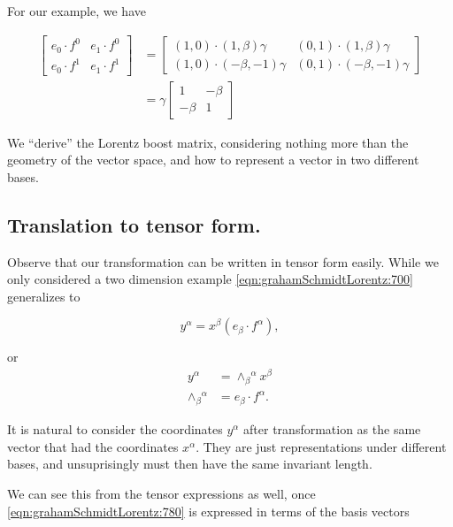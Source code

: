 \documentclass[iop,tighten]{emulateapj}
\begin{document}
For our example, we have

\begin{equation}\label{eqn:grahamSchmidtLorentz:740}
\begin{aligned}
\begin{bmatrix}
e_0 \cdot f^0 & e_1 \cdot f^0 \\
e_0 \cdot f^1 & e_1 \cdot f^1
\end{bmatrix}
&=
\begin{bmatrix}
(1, 0) \cdot ( 1, \beta ) \gamma & (0, 1) \cdot ( 1, \beta ) \gamma \\
(1, 0) \cdot ( -\beta, -1) \gamma & (0, 1) \cdot ( -\beta, -1) \gamma
\end{bmatrix} \\
&=
\gamma 
\begin{bmatrix}
1 & - \beta \\
- \beta & 1
\end{bmatrix}
\end{aligned}
\end{equation}

We ``derive'' the Lorentz boost matrix, considering nothing more than the geometry of the vector space, and how to represent a vector in two different bases.

\subsection{Translation to tensor form.}

Observe that our transformation can be written in tensor form easily.  While we only considered a two dimension example \ref{eqn:grahamSchmidtLorentz:700} generalizes to

\begin{equation}\label{eqn:grahamSchmidtLorentz:760}
y^\alpha = x^\beta (e_\beta \cdot f^\alpha),
\end{equation}

or
\begin{align}\label{eqn:grahamSchmidtLorentz:780}
y^\alpha &= {\wedge_\beta}^\alpha x^\beta \\
{\wedge_\beta}^\alpha &= e_\beta \cdot f^\alpha.
\end{align}

It is natural to consider the coordinates $y^\alpha$ after transformation as the same vector that had the coordinates $x^\alpha$.  They are just representations under different bases, and unsuprisingly must then have the same invariant length.

We can see this from the tensor expressions as well, once \ref{eqn:grahamSchmidtLorentz:780} is expressed in terms of the basis vectors
\end{document}
